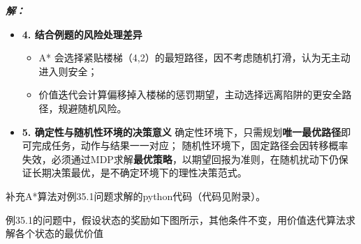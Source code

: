 \documentclass[12pt, a4paper]{article}
\newenvironment{solution}{
	\par\vspace{0.2cm}\noindent\textbf{\color{themecolor} \textit{解：}}
}{
	\par\vspace{0.5cm} %
}
\begin{document}
\begin{solution}
\begin{itemize}
			\item[] \textbf{4. 结合例题的风险处理差异}
			\begin{itemize}
				\item[] A* 会选择紧贴楼梯（4,2）的最短路径，因不考虑随机打滑，认为无主动进入则安全；
				\item[] 价值迭代会计算偏移掉入楼梯的惩罚期望，主动选择远离陷阱的更安全路径，规避随机风险。
			\end{itemize}
			
			\item[] \textbf{5. 确定性与随机性环境的决策意义}
			确定性环境下，只需规划\textbf{唯一最优路径}即可完成任务，动作与结果一一对应；
			随机性环境下，固定路径会因转移概率失效，必须通过MDP求解\textbf{最优策略}，以期望回报为准则，在随机扰动下仍保证长期决策最优，是不确定环境下的理性决策范式。
		\end{itemize}
		
		补充A*算法对例35.1问题求解的python代码（代码见附录）。
	\end{solution}
	
	\clearpage
	\begin{problem}[习题 35.9]
		例35.1的问题中，假设状态的奖励如下图所示，其他条件不变，用价值迭代算法求解各个状态的最优价值
	\end{problem}
	
\end{document}
